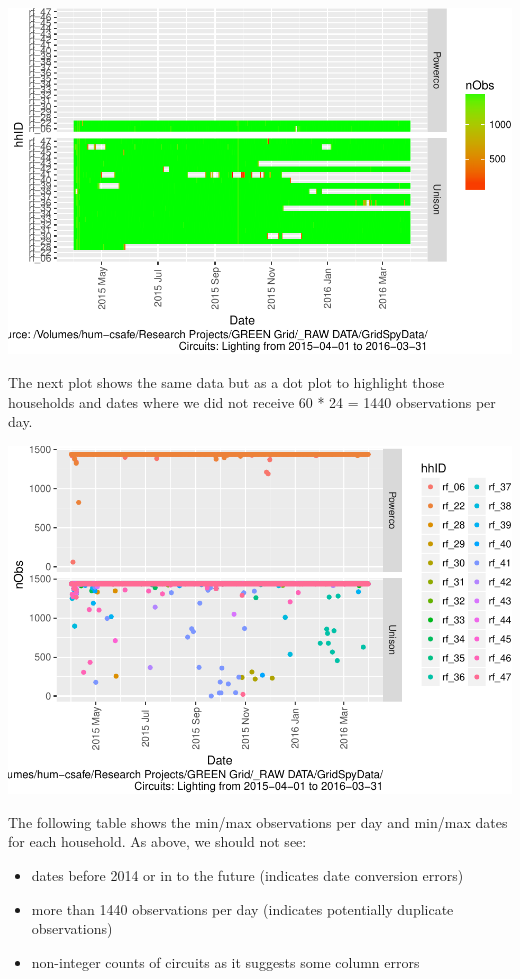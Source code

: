 \documentclass[]{article}
\providecommand{\tightlist}{%
  \setlength{\itemsep}{0pt}\setlength{\parskip}{0pt}}
\begin{document}
\includegraphics{nzGGHouseholdPowerDemandProfile_Lighting_2015-04-01_2016-03-31_files/figure-latex/loadedFilesObs Tile Plot-1.pdf}

The next plot shows the same data but as a dot plot to highlight those
households and dates where we did not receive 60 * 24 = 1440
observations per day.

\includegraphics{nzGGHouseholdPowerDemandProfile_Lighting_2015-04-01_2016-03-31_files/figure-latex/loadedFilesObs point plot-1.pdf}

The following table shows the min/max observations per day and min/max
dates for each household. As above, we should not see:

\begin{itemize}
\tightlist
\item
  dates before 2014 or in to the future (indicates date conversion
  errors)
\item
  more than 1440 observations per day (indicates potentially duplicate
  observations)
\item
  non-integer counts of circuits as it suggests some column errors
\end{itemize}
\end{document}
